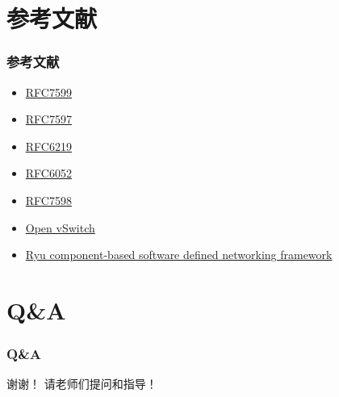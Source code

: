 \documentclass{beamer}
\begin{document}
\section{参考文献}
\begin{frame}
  \frametitle{参考文献}
  \begin{itemize}
  \item \href{https://tools.ietf.org/html/rfc7599}{RFC7599}
  \item \href{https://tools.ietf.org/html/rfc7597}{RFC7597}
  \item \href{https://tools.ietf.org/html/rfc6219}{RFC6219}
  \item \href{https://tools.ietf.org/html/rfc6052}{RFC6052}
  \item \href{https://tools.ietf.org/html/rfc7598}{RFC7598}
  \item
    \href{http://openvswitch.org/}{Open vSwitch}
  \item
    \href{http://osrg.github.io/ryu/}{Ryu component-based software defined networking framework }
  \end{itemize}
\end{frame}

\section{Q\&A}

\begin{frame}
  \frametitle{Q\&A}
  \begin{center}
    {\LARGE 谢谢！}
    \vspace{3em}
    {\LARGE 请老师们提问和指导！}
  \end{center}
\end{frame}
\end{document}
